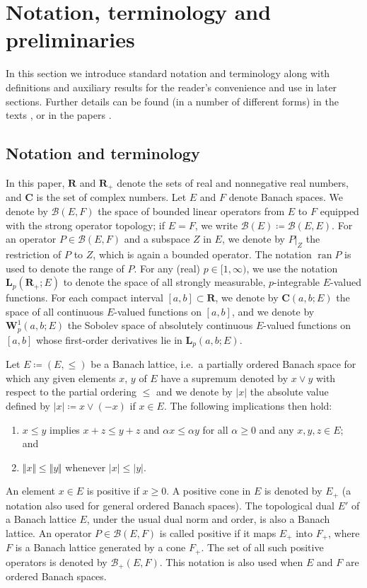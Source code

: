 \documentclass[a4paper,11pt,reqno]{amsart}
\def\calB{{\calB}}
\def\calB{{\mathcal{B}}}
\def\R{\mathbf{R}}
\def\C{\mathbf{C}}
\theoremstyle{plain}
\numberwithin{equation}{section}
\begin{document}
\section{Notation, terminology and preliminaries}\label{Sec:1}

In this section we introduce standard notation and terminology along with definitions and auxiliary results for the reader's convenience and use in later sections. Further details can be found (in a number of different forms) in the texts \cite{MR2262133,MR423039,MR3616245,MR2154892,MR2502023,MR839450}, or in the papers \cite{MR4910475,MR1359020,GANTOUH2026106307,StaffansWeiss2002}.

\subsection{Notation and terminology}

In this paper, $\R$ and $\R_+$ denote the sets of real and nonnegative real numbers, and $\C$ is the set of complex numbers. Let $E$ and $F$ denote Banach spaces. We denote by $\calB(E,F)$ the space of bounded linear operators from $E$ to $F$ equipped with the strong operator topology; if $E=F$, we write $\calB(E)\coloneqq \calB(E,E)$. For an operator $P\in \calB(E,F)$ and a subspace $Z$ in $E$, we denote by $P\vert_{Z}$ the restriction of $P$ to $Z$, which is again a bounded operator. The notation $\operatorname{ran}P$ is used to denote the range of $P$. For any (real) $p\in [1,\infty)$, we use the notation $\bm{L}_p(\R_+;E)$ to denote the space of all strongly measurable, $p$-integrable $E$-valued functions. For each compact interval $[a,b]\subset \R$, we denote by $\bm{C}(a,b;E)$ the space of all continuous $E$-valued functions on $[a,b]$, and we denote by $\bm{W}^{1}_p(a,b;E)$ the Sobolev space of absolutely continuous $E$-valued functions on $[a,b]$ whose first-order derivatives lie in $\bm{L}_p(a,b;E)$.

Let $E\coloneqq (E,\le)$ be a Banach lattice, i.e.\ a partially ordered Banach space for which any given elements $x$, $y$ of $E$ have a supremum denoted by $x \vee y$ with respect to the partial ordering $\le$ and we denote by $\vert x\vert$ the absolute value defined by $\vert x\vert \coloneqq x\vee (-x)$ if $x\in E$. The following implications then hold:
\begin{enumerate}[label=\normalfont(\roman*)]
\item $x\leq y$ implies $x+z\le y+z $ and $\alpha x\leq \alpha y$ for all $\alpha\ge 0$ and any $x,y,z\in E$; and
\item $\Vert x\Vert \leq \Vert y\Vert$ whenever $\vert x\vert \leq \vert y\vert$.
\end{enumerate}
An element $x\in E$ is positive if $x\ge 0$. A positive cone in $E$ is denoted by $E_+$ (a notation also used for general ordered Banach spaces). The topological dual $E'$ of a Banach lattice $E$, under the usual dual norm and order, is also a Banach lattice. An operator $P\in \calB(E,F)$ is called positive if it maps $E_+$ into $F_+$, where $F$ is a Banach lattice generated by a cone $F_+$. The set of all such positive operators is denoted by $ \calB_+(E,F) $. This notation is also used when $E$ and $F$ are ordered Banach spaces. 
\end{document}
